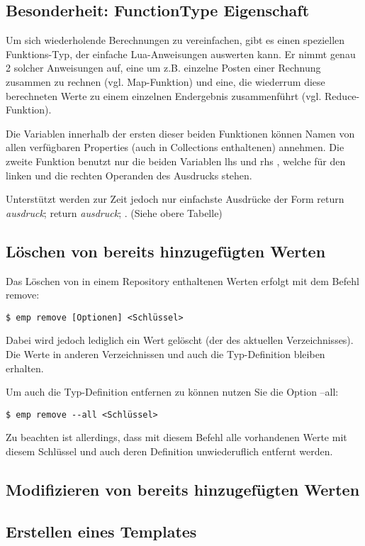 \subsection{Besonderheit: FunctionType Eigenschaft}
Um sich wiederholende Berechnungen zu vereinfachen, gibt es einen speziellen Funktions-Typ, der einfache Lua-Anweisungen auswerten kann. Er nimmt genau 2 solcher Anweisungen auf, eine um z.B. einzelne Posten einer Rechnung zusammen zu rechnen (vgl. \grqq Map-Funktion\grqq) und eine, die wiederrum diese berechneten Werte zu einem einzelnen Endergebnis zusammenführt (vgl. \grqq Reduce-Funktion\grqq).

Die Variablen innerhalb der ersten dieser beiden Funktionen können Namen von allen verfügbaren Properties (auch in Collections enthaltenen) annehmen. Die zweite Funktion benutzt nur die beiden Variablen \grqq lhs \grqq und \grqq rhs \grqq , welche für den linken und die rechten Operanden des Ausdrucks stehen.

Unterstützt werden zur Zeit jedoch nur einfachste Ausdrücke der Form \grqq return \emph{ausdruck}; return \emph{ausdruck}; \grqq. (Siehe obere Tabelle)


\subsection{Löschen von bereits hinzugefügten Werten}
Das Löschen von in einem Repository enthaltenen Werten erfolgt mit dem Befehl remove:
\begin{lstlisting}[style=Bash]
$ emp remove [Optionen] <Schlüssel>
\end{lstlisting}

Dabei wird jedoch lediglich ein Wert gelöscht (der des aktuellen Verzeichnisses). Die Werte in anderen Verzeichnissen und auch die Typ-Definition bleiben erhalten.

Um auch die Typ-Definition entfernen zu können nutzen Sie die Option --all:
\begin{lstlisting}[style=Bash]
$ emp remove --all <Schlüssel>
\end{lstlisting}
Zu beachten ist allerdings, dass mit diesem Befehl alle vorhandenen Werte mit diesem Schlüssel und auch deren Definition unwiederuflich entfernt werden.

\subsection{Modifizieren von bereits hinzugefügten Werten}
\subsection{Erstellen eines Templates}
